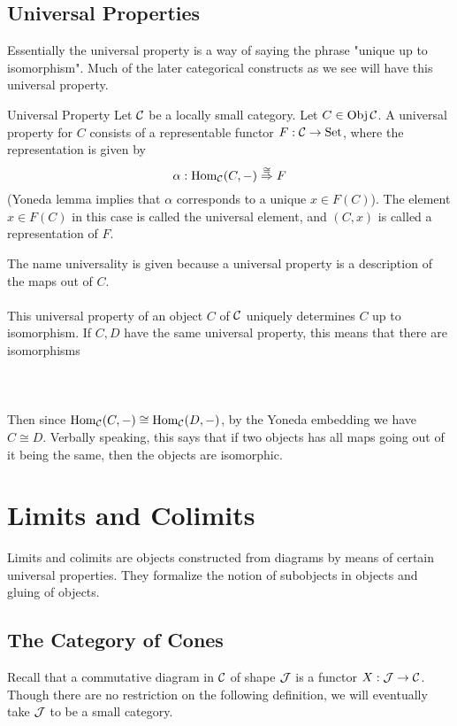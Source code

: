 \documentclass[a4paper]{article}
\begin{document}
\subsection{Universal Properties}
Essentially the universal property is a way of saying the phrase "unique up to isomorphism". Much of the later categorical constructs as we see will have this universal property. 

\begin{defn}{Universal Property}{} Let $\mathcal{C}$ be a locally small category. Let $C\in\operatorname{Obj}\mathcal{C}$. A universal property for $C$ consists of a representable functor $F:\mathcal{C}\to\text{Set}$, where the representation is given by $$\alpha:\operatorname{Hom}_{\mathcal{C}}(C,-)\overset{\cong}{\Rightarrow}F$$ (Yoneda lemma implies that $\alpha$ corresponds to a unique $x\in F(C)$). The element $x\in F(C)$ in this case is called the universal element, and $(C,x)$ is called a representation of $F$. 
\end{defn}

The name universality is given because a universal property is a description of the maps out of $C$. \\~\\
This universal property of an object $C$ of $\mathcal{C}$ uniquely determines $C$ up to isomorphism. If $C,D$ have the same universal property, this means that there are isomorphisms \\~\\
\\~\\ Then since $\operatorname{Hom}_{\mathcal{C}}(C,-)\cong\operatorname{Hom}_{\mathcal{C}}(D,-)$, by the Yoneda embedding we have $C\cong D$. Verbally speaking, this says that if two objects has all maps going out of it being the same, then the objects are isomorphic. 

\pagebreak
\section{Limits and Colimits}
Limits and colimits are objects constructed from diagrams by means of certain universal properties. They formalize the notion of subobjects in objects and gluing of objects. 

\subsection{The Category of Cones}
Recall that a commutative diagram in $\mathcal{C}$ of shape $\mathcal{J}$ is a functor $X:\mathcal{J}\to\mathcal{C}$. Though there are no restriction on the following definition, we will eventually take $\mathcal{J}$ to be a small category. 
\end{document}
